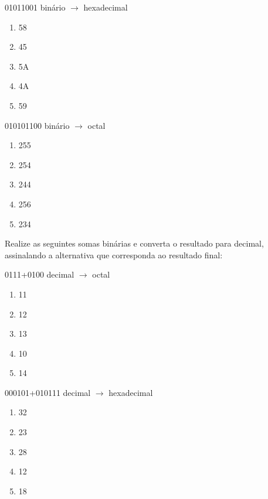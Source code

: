 \bigskip
\begin{minipage}{.45\textwidth}
\exercise \vfill
{\large 01011001} binário $\rightarrow$ hexadecimal
\begin{enumerate}[\itemlabel]
\item 58
\item 45
\item 5A
\item 4A
\item 59 %
\end{enumerate}
\end{minipage}\hspace{.05\textwidth}
\begin{minipage}{.45\textwidth}

\exercise
{\large 010101100} binário $\rightarrow$ octal
\begin{enumerate}[\itemlabel]
\item 255
\item 254 %
\item 244
\item 256
\item 234
\end{enumerate}
\end{minipage}


Realize as seguintes somas binárias e converta o resultado para
decimal, assinalando a alternativa que corresponda ao resultado final:

\bigskip
\begin{minipage}{.45\textwidth}
\exercise \vfill
{\large 0111+0100} decimal $\rightarrow$ octal
\begin{enumerate}[\itemlabel]
\item 11 %
\item 12
\item 13
\item 10
\item 14
\end{enumerate}
\end{minipage}\hspace{.075\textwidth}
\begin{minipage}{.4\textwidth}
\exercise
{\large 000101+010111} decimal $\rightarrow$ hexadecimal
\begin{enumerate}[\itemlabel]
\item 32
\item 23
\item 28 %
\item 12
\item 18
\end{enumerate}
\end{minipage}

